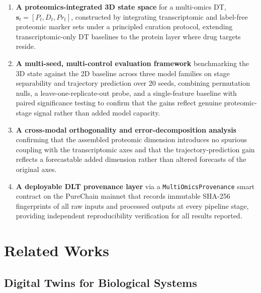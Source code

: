 \documentclass[5p,times,twocolumn]{elsarticle}
\newcommand{\rtag}[1]{}
\newcommand{\rev}[2]{\rtag{#1}#2}
\newcommand{\lang}[1]{#1}
\begin{document}
\begin{enumerate}
  \item \textbf{A proteomics-integrated 3D state space}
  for a multi-omics DT,
  $\mathbf{s}_{t} = [P_{t}, D_{t}, Pr_{t}]$,
  constructed by integrating transcriptomic and
  label-free proteomic marker sets under a principled
  curation protocol, extending transcriptomic-only DT
  baselines to the protein layer where drug targets
  reside.
  \item \textbf{A multi-seed, multi-control evaluation
    framework} benchmarking the 3D state against the 2D
  baseline across three model families on stage
  separability and trajectory prediction over 20 seeds,
  combining permutation nulls, a leave-one-replicate-out
  probe, and a single-feature baseline with paired
  significance testing to confirm \lang{that} the gains reflect
  genuine proteomic-stage signal rather than added model
  capacity.
  \item \textbf{A cross-modal orthogonality and
    error-decomposition analysis} confirming that the
  \rev{AC}{assembled proteomic dimension introduces no spurious
    coupling with} the transcriptomic axes and that the
  trajectory-prediction gain reflects a forecastable
  added dimension rather than altered forecasts of the
  original axes.
  \item \textbf{A deployable DLT provenance layer} via a
  \texttt{MultiOmicsProvenance} smart contract on the
  PureChain mainnet that records immutable SHA-256
  fingerprints of all raw inputs and processed outputs
  at every pipeline stage, providing independent
  reproducibility verification for all results reported.
\end{enumerate}

\section{Related Works}

\subsection{\textbf{Digital Twins for Biological Systems}}
\end{document}
